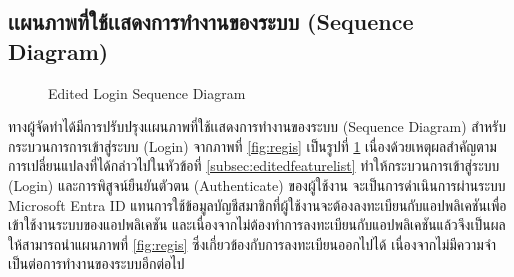 \documentclass[14pt,oneside,openright,a4paper]{cpe-thai-project}
\begin{document}
  \subsection{เเผนภาพที่ใช้เเสดงการทำงานของระบบ (Sequence Diagram)}
   \begin{figure}[H]\centering
    \setlength{\fboxrule}{0.5mm} %
    \setlength{\fboxsep}{0.5cm}
    \caption{Edited Login Sequence Diagram}\label{fig:editedloginsequencediagram}
   \end{figure}
  \newpage
  ทางผู้จัดทําได้มีการปรับปรุงเเผนภาพที่ใช้เเสดงการทำงานของระบบ (Sequence Diagram) สำหรับกระบวนการการเข้าสู่ระบบ (Login) จากภาพที่ \ref{fig:regis} เป็นรูปที่ \ref{fig:editedloginsequencediagram} เนื่องด้วยเหตุผลสําคัญตามการเปลี่ยนแปลงที่ได้กล่าวไปในหัวข้อที่ \ref{subsec:editedfeaturelist} ทำให้กระบวนการเข้าสู่ระบบ (Login) และการพิสูจน์ยืนยันตัวตน (Authenticate) ของผู้ใช้งาน 
  จะเป็นการดําเนินการผ่านระบบ Microsoft Entra ID แทนการใช้ข้อมูลบัญชีสมาชิกที่ผู้ใช้งานจะต้องลงทะเบียนกับแอปพลิเคชันเพื่อเข้าใช้งานระบบของแอปพลิเคชัน และเนื่องจากไม่ต้องทำการลงทะเบียนกับแอปพลิเคชันแล้วจึงเป็นผลให้สามารถนําแผนภาพที่ \ref{fig:regis} ซึ่งเกี่ยวข้องกับการลงทะเบียนออกไปได้ เนื่องจากไม่มีความจําเป็นต่อการทํางานของระบบอีกต่อไป
\end{document}
